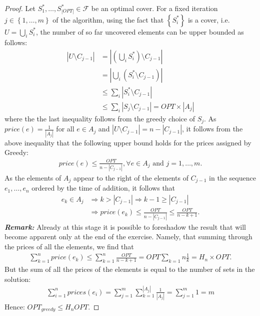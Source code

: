 \documentclass[10pt]{article}
\newcommand{\Fcal}{\mathcal{F}}
\newenvironment{exercise}[2][Exercise]{\begin{trivlist}
  \item[\hskip \labelsep {\bfseries #1}\hskip \labelsep {\bfseries #2.}]}{\end{trivlist}}
\begin{document}
\begin{exercise}{3a}
    \begin{proof}
    Let $S^*_1, \ldots, S^*_{|OPT|} \in \Fcal$ be an optimal cover. For a fixed
    iteration $j \in \left\{1, \ldots, m\right\}$ of the algorithm, using the
    fact that $\left\{S_i^*\right\}$ is a cover, i.e. $U =
    \bigcup_i S^*_i$, the number of so far uncovered elements can be upper bounded
    as follows:
    \begin{align*}
      |U \setminus C_{j - 1}| &= \left|\left( \bigcup_i S^*_i \right) \setminus C_{j - 1}\right| \\
      &= \left| \bigcup_i (S^*_i \setminus C_{j - 1}) \right| \\
      &\leq \sum_i \left| S^*_i \setminus C_{j-1} \right| \\
      &\leq \sum_i \left| S_j \setminus C_{j-1} \right| = OPT \times |A_j|
    \end{align*}
    where the the last inequality follows from the greedy choice of $S_j$. As
    $price(e) = \frac{1}{|A_j|}$ for all $e \in A_j$ and $|U \setminus C_{j - 1}| = n -
    |C_{j - 1}|$, it follows from the above inequality that the following upper
    bound holds for the prices assigned by \textrm{Greedy}:
    \begin{align*}
      price(e) \leq \frac{OPT}{n - |C_{j - 1}|}, \forall e \in A_j\textrm{ and }j = 1, \ldots, m.
    \end{align*}
    As the elements of $A_j$ appear to the right of the elements of $C_{j-
      1}$ in the sequence $e_1, \ldots, e_n$ ordered by the time of addition, it
    follows that
    \begin{align*}
      e_k \in A_j &\Rightarrow k > |C_{j - 1}| \Rightarrow k - 1 \geq |C_{j - 1}|\\
                    &\Rightarrow price(e_k) \leq \frac{OPT}{n - |C_{j - 1}|} \leq \frac{OPT}{n  - k  +1}.
    \end{align*}
    \textit{\textbf{Remark: }}Already at this stage it is possible to foreshadow the result that will
    become apparent only at the end of the exercise. Namely, that summing through the prices of all
    the elements, we find that
    \begin{align*}
      \sum_{k = 1}^n price(e_k) \leq \sum_{k = 1}^n\frac{OPT}{ n - k  + 1} = OPT \sum_{k = 1}{n} \frac{1}{k} = H_n \times OPT.
      \end{align*}
    But the sum of all the prices of the elements is equal to the number of sets
    in the solution:
    \begin{align*}
      \sum_{i = 1}^n prices(e_i) = \sum_{j = 1}^{m} \sum_{k = 1}^{|A_j|} \frac{1}{|A_j|} = \sum_{j = 1}^m 1 = m
    \end{align*}
    Hence: $OPT_{greedy} \leq H_n OPT$.
    \end{proof}
\end{exercise}
\end{document}
